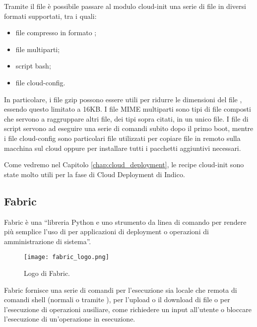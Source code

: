             Tramite il file  è possibile passare al modulo cloud-init una serie di file in diversi formati supportati, tra i quali:
            
            \begin{itemize}
                \item file compresso in formato ;
                \item file  multiparti;
                \item script bash;
                \item file cloud-config.
            \end{itemize}
            
            In particolare, i file gzip possono essere utili per ridurre le dimensioni del file , essendo questo limitato a 16KB. I file \ac{MIME} multiparti sono tipi di file composti che servono a raggruppare altri file, dei tipi sopra citati, in un unico file. I file di script servono ad eseguire una serie di comandi subito dopo il primo boot, mentre i file cloud-config sono particolari file utilizzati per copiare file in remoto sulla macchina sul cloud oppure per installare tutti i pacchetti aggiuntivi necessari.
            
            Come vedremo nel Capitolo \ref{chap:cloud_deployment}, le recipe cloud-init sono state molto utili per la fase di Cloud Deployment di Indico.
                    
        \subsection{Fabric} \label{subsec:p;sl;fabric}
        
            Fabric è una ``libreria Python e uno strumento da linea di comando per rendere più semplice l'uso di  per applicazioni di deployment o operazioni di amministrazione di sistema''. \cite{fabric:documentation}
            
        	\begin{figure}[h!]
        		\begin{center}
        			\texttt{[image: fabric\_logo.png]}
        		\end{center}
        		\caption[Logo di Fabric]{Logo di Fabric.}
        		\label{fig:fabric_logo}
        	\end{figure}
            
            Fabric fornisce una serie di comandi per l'esecuzione sia locale che remota di comandi shell (normali o tramite ), per l'upload o il download di file o per l'esecuzione di operazioni ausiliare, come richiedere un input all'utente o bloccare l'esecuzione di un'operazione in esecuzione.
            
